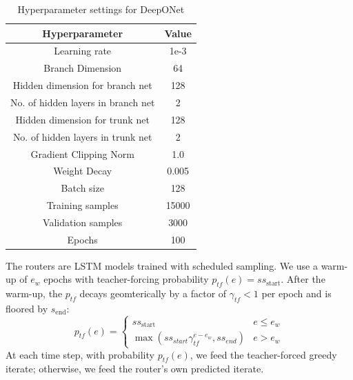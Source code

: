 \documentclass{article} %
\begin{document}
\begin{table}
    \centering
    \begin{tabular}{|c|c|}
        \hline
        Hyperparameter & Value\\
        \hline \hline
        Learning rate & 1e-3 \\
        Branch Dimension & 64 \\
        Hidden dimension for branch net & 128 \\
        No. of hidden layers in branch net & 2\\
        Hidden dimension for trunk net & 128 \\
        No. of hidden layers in trunk net & 2\\
        Gradient Clipping Norm & 1.0  \\
        Weight Decay & 0.005 \\
        Batch size & 128 \\
        Training samples & 15000 \\
        Validation samples & 3000 \\
        Epochs & 100 \\
        \hline
    \end{tabular}
    \caption{Hyperparameter settings for DeepONet}
    \label{tab:hpsettings}
\end{table}

The routers are LSTM models trained with scheduled sampling.
We use a warm-up of $e_{w}$ epochs with teacher-forcing probability $p_{tf}(e) = ss_{\text{start}}$. After the warm-up, the $p_{tf}$ decays geomterically by a factor of $\gamma_{tf} < 1$ per epoch and is floored by $s_{\text{end}}$:
\begin{equation*}
    p_{tf}(e) = \begin{cases}
        ss_{\text{start}} & e \leq e_w\\
        \max(ss_{start}\gamma_{tf}^{e - e_{w}}, ss_{end}) & e > e_w
    \end{cases}
\end{equation*}
At each time step, with probability $p_{tf}(e)$, we feed the teacher-forced greedy iterate; otherwise, we feed the router's own predicted iterate.
\end{document}
